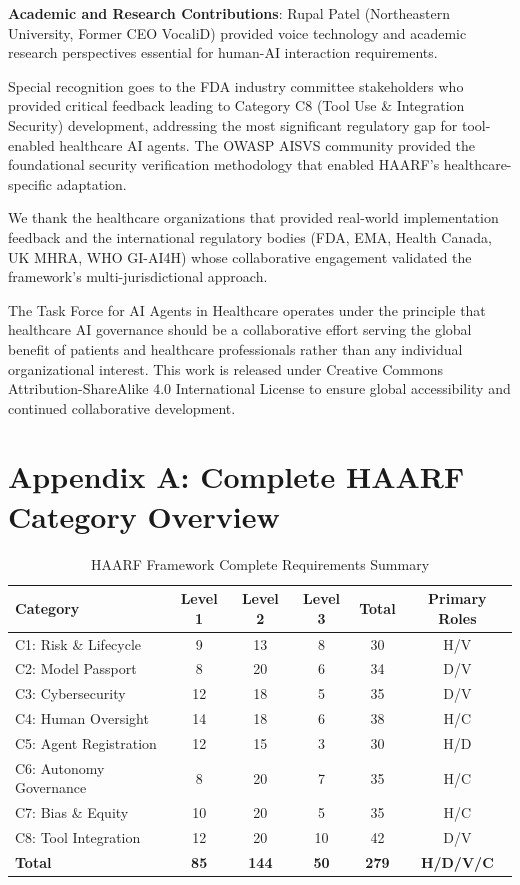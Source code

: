 \documentclass[11pt]{article}
\begin{document}
\textbf{Academic and Research Contributions}: Rupal Patel (Northeastern University, Former CEO VocaliD) provided voice technology and academic research perspectives essential for human-AI interaction requirements.

Special recognition goes to the FDA industry committee stakeholders who provided critical feedback leading to Category C8 (Tool Use \& Integration Security) development, addressing the most significant regulatory gap for tool-enabled healthcare AI agents. The OWASP AISVS community provided the foundational security verification methodology that enabled HAARF's healthcare-specific adaptation.

We thank the healthcare organizations that provided real-world implementation feedback and the international regulatory bodies (FDA, EMA, Health Canada, UK MHRA, WHO GI-AI4H) whose collaborative engagement validated the framework's multi-jurisdictional approach.

The Task Force for AI Agents in Healthcare operates under the principle that healthcare AI governance should be a collaborative effort serving the global benefit of patients and healthcare professionals rather than any individual organizational interest. This work is released under Creative Commons Attribution-ShareAlike 4.0 International License to ensure global accessibility and continued collaborative development.




\section*{Appendix A: Complete HAARF Category Overview}

\begin{table}[H]
\centering
\footnotesize
\caption{HAARF Framework Complete Requirements Summary}
\begin{tabular}{|l|c|c|c|c|c|}
\hline
\textbf{Category} & \textbf{Level 1} & \textbf{Level 2} & \textbf{Level 3} & \textbf{Total} & \textbf{Primary Roles} \\
\hline
C1: Risk \& Lifecycle & 9 & 13 & 8 & 30 & H/V \\
C2: Model Passport & 8 & 20 & 6 & 34 & D/V \\
C3: Cybersecurity & 12 & 18 & 5 & 35 & D/V \\
C4: Human Oversight & 14 & 18 & 6 & 38 & H/C \\
C5: Agent Registration & 12 & 15 & 3 & 30 & H/D \\
C6: Autonomy Governance & 8 & 20 & 7 & 35 & H/C \\
C7: Bias \& Equity & 10 & 20 & 5 & 35 & H/C \\
C8: Tool Integration & 12 & 20 & 10 & 42 & D/V \\
\hline
\textbf{Total} & \textbf{85} & \textbf{144} & \textbf{50} & \textbf{279} & \textbf{H/D/V/C} \\
\hline
\end{tabular}
\end{table}
\end{document}
